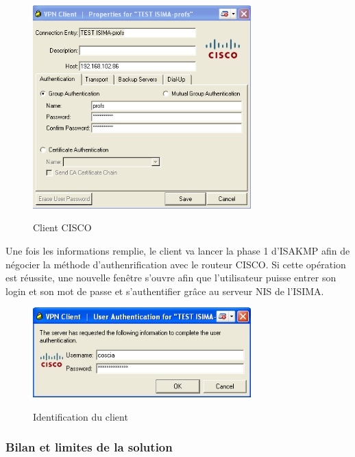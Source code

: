 \begin{figure}[H]
	\begin{center}
		\includegraphics[width=0.75\textwidth]{partie_2/screen_windows/client_cisco.png}\\
	\end{center}
	\caption{Client CISCO}
	\label{VPN_CISCO}
\end{figure}


Une fois les informations remplie, le client va lancer la phase 1 d'ISAKMP afin de négocier la méthode d'authenrification avec le routeur CISCO. Si cette opération est réussite, une nouvelle fenêtre s'ouvre afin que l'utilisateur puisse entrer son login et son mot de passe et s'authentifier grâce au serveur NIS de l'ISIMA.

\begin{figure}[H]
	\begin{center}
		\includegraphics[width=0.75\textwidth]{partie_2/screen_windows/fenetre_connexion.PNG}\\
	\end{center}
	\caption{Identification du client}
	\label{VPN_CISCO_CLIENT}
\end{figure}



\subsubsection{Bilan et limites de la solution}


